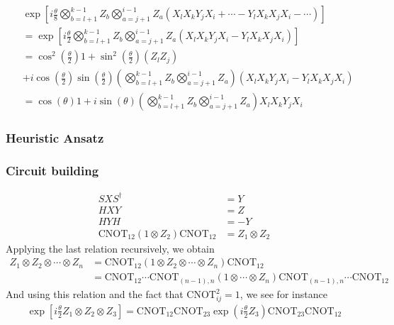 \documentclass[11pt, oneside]{article}   	%
\begin{document}
\begin{align}
&\exp \left[ i \frac{\theta}{8} \bigotimes^{k-1}_{b=l+1} Z_b \bigotimes^{i-1}_{a=j+1} Z_a (X_l X_k Y_j X_i + \cdots - Y_l X_k X_j X_i - \cdots) \right] \\
& = \exp \left[ i \frac{\theta}{2} \bigotimes^{k-1}_{b=l+1} Z_b \bigotimes^{i-1}_{a=j+1} Z_a (X_l X_k Y_j X_i - Y_l X_k X_j X_i) \right] \\
&= \cos^2 \left( \frac{\theta}{2} \right) 1 + \sin^2 \left( \frac{\theta}{2} \right) (Z_l Z_j) \\
&+ i \cos \left( \frac{\theta}{2} \right) \sin \left( \frac{\theta}{2} \right) 
\left( \bigotimes^{k-1}_{b=l+1} Z_b \bigotimes^{i-1}_{a=j+1} Z_a \right) (X_l X_k Y_j X_i - Y_l X_k X_j X_i) \\
&= \cos (\theta) 1 + i \sin (\theta) \left( \bigotimes^{k-1}_{b=l+1} Z_b \bigotimes^{i-1}_{a=j+1} Z_a \right) X_l X_k Y_j X_i
\end{align}

\subsubsection{Heuristic Ansatz}

\subsubsection{Circuit building}
\begin{align}
S X S^{\dagger} &= Y \\
H X Y &= Z \\
H Y H &= -Y \\
\mathrm{CNOT}_{12} (1 \otimes Z_2) \mathrm{CNOT}_{12} &= Z_1 \otimes Z_2
\end{align}
Applying the last relation recursively, we obtain
\begin{align}
Z_1 \otimes Z_2 \otimes \cdots \otimes Z_n  
&= \mathrm{CNOT}_{12} (1 \otimes Z_2 \otimes \cdots \otimes Z_n ) \mathrm{CNOT}_{12} \\
&= \mathrm{CNOT}_{12} \cdots \mathrm{CNOT}_{(n-1), n} (1 \otimes \cdots \otimes Z_n ) \mathrm{CNOT}_{(n-1), n} \cdots \mathrm{CNOT}_{12} 
\end{align}
And using this relation and the fact that $\mathrm{CNOT}^2_{ij} = 1$, we see for instance
\begin{align}
\exp \left[ i \frac{\theta}{2} Z_1 \otimes Z_2 \otimes Z_3 \right] 
= \mathrm{CNOT}_{12} \mathrm{CNOT}_{23} \exp \left( i \frac{\theta}{2} Z_3 \right) \mathrm{CNOT}_{23} \mathrm{CNOT}_{12}
\end{align}
\end{document}
